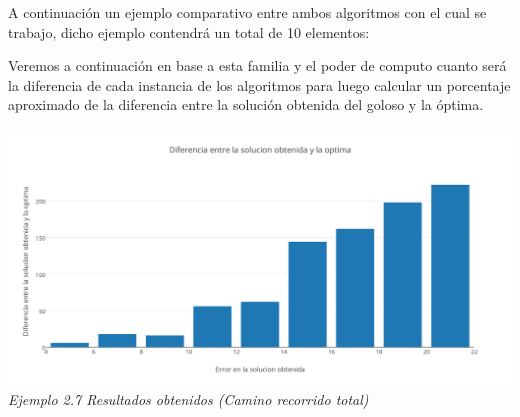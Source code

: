 A continuaci\'on un ejemplo comparativo entre ambos algoritmos con el cual se trabajo, dicho ejemplo contendr\'a un total de 10 elementos:



\begin{figure} [!ht]
 \centering
       \label{fig:jaggies}
    \label{fig:moire}
    \end{figure}



Veremos a continuaci\'on en base a esta familia y el poder de computo cuanto ser\'a la diferencia de cada instancia de los algoritmos para luego calcular un porcentaje aproximado de la diferencia entre la soluci\'on obtenida del goloso y la \'optima.

\vspace*{0.3cm} \vspace*{0.3cm}
  \begin{center}
\includegraphics[scale=0.5]{./EJ2/algungym0.png}
\\{\textit{Ejemplo 2.7 Resultados obtenidos (Camino recorrido total) }}
  \end{center}
  \vspace*{0.3cm}



